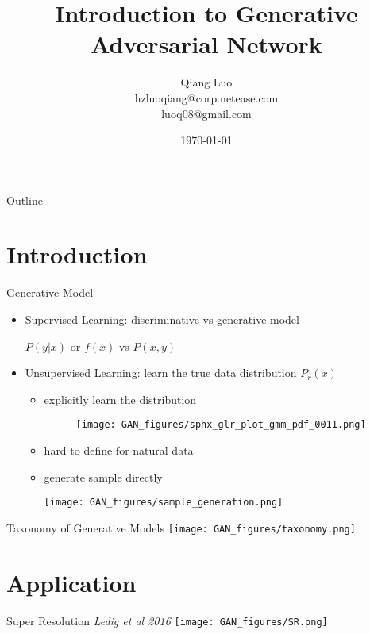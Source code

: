 \documentclass[9pt]{beamer}
\title[]{Introduction to Generative Adversarial Network}
\author{Qiang Luo\\ hzluoqiang@corp.netease.com \\ luoq08@gmail.com}
\date{\today}
\begin{document}
\begin{frame}
  \titlepage
\end{frame}

\begin{frame}{Outline}
 \tableofcontents
\end{frame}

\section{Introduction}

\begin{frame}{Generative Model}

  \begin{itemize}
  \item Supervised Learning: discriminative vs generative model

    $P(y|x)$ or $f(x)$ vs $P(x,y)$
  \item Unsupervised Learning: learn the true data distribution $P_r(x)$
    \begin{itemize}
    \item explicitly learn the distribution
      \begin{figure}[!]
	\centering
        \texttt{[image: GAN\_figures/sphx\_glr\_plot\_gmm\_pdf\_0011.png]}
      \end{figure}
    \item hard to define for natural data
    \item generate sample directly
      \begin{center}
        \texttt{[image: GAN\_figures/sample\_generation.png]}
      \end{center}
    \end{itemize}
  \end{itemize}
\end{frame}

\begin{frame}{Taxonomy of Generative Models}
  \texttt{[image: GAN\_figures/taxonomy.png]}
\end{frame}

\section{Application}
\begin{frame}{Super Resolution}
  \emph{Ledig et al 2016}
  \texttt{[image: GAN\_figures/SR.png]}
\end{frame}
\end{document}
